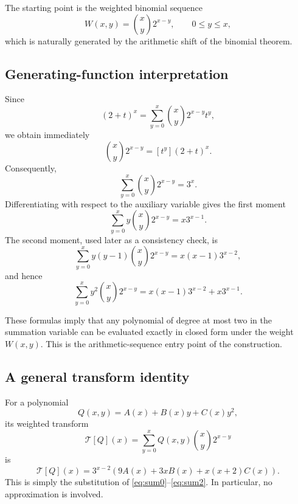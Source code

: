 \documentclass[11pt,a4paper]{article}
\begin{document}
The starting point is the weighted binomial sequence
\begin{equation}
W(x,y)=\binom{x}{y}2^{x-y},
\qquad 0\le y\le x,
\label{eq:W}
\end{equation}
which is naturally generated by the arithmetic shift of the binomial theorem.

\subsection{Generating-function interpretation}

Since
\begin{equation}
(2+t)^x=\sum_{y=0}^{x}\binom{x}{y}2^{x-y}t^y,
\end{equation}
we obtain immediately
\begin{equation}
\boxed{\binom{x}{y}2^{x-y}=[t^y](2+t)^x.}
\label{eq:coefficient}
\end{equation}
Consequently,
\begin{equation}
\sum_{y=0}^{x}\binom{x}{y}2^{x-y}=3^x.
\label{eq:sum0}
\end{equation}
Differentiating with respect to the auxiliary variable gives the first moment
\begin{equation}
\sum_{y=0}^{x}y\binom{x}{y}2^{x-y}=x3^{x-1}.
\label{eq:sum1}
\end{equation}
The second moment, used later as a consistency check, is
\begin{equation}
\sum_{y=0}^{x}y(y-1)\binom{x}{y}2^{x-y}=x(x-1)3^{x-2},
\end{equation}
and hence
\begin{equation}
\sum_{y=0}^{x}y^2\binom{x}{y}2^{x-y}
=x(x-1)3^{x-2}+x3^{x-1}.
\label{eq:sum2}
\end{equation}

These formulas imply that any polynomial of degree at most two in the summation variable can be evaluated exactly in closed form under the weight \(W(x,y)\). This is the arithmetic-sequence entry point of the construction.

\subsection{A general transform identity}

For a polynomial
\[
Q(x,y)=A(x)+B(x)y+C(x)y^2,
\]
its weighted transform
\[
\mathcal T[Q](x)=\sum_{y=0}^{x}Q(x,y)\binom{x}{y}2^{x-y}
\]
is
\begin{equation}
\mathcal T[Q](x)
=3^{x-2}\left(9A(x)+3xB(x)+x(x+2)C(x)\right).
\label{eq:generaltransform}
\end{equation}
This is simply the substitution of \eqref{eq:sum0}--\eqref{eq:sum2}. In particular, no approximation is involved.
\end{document}
